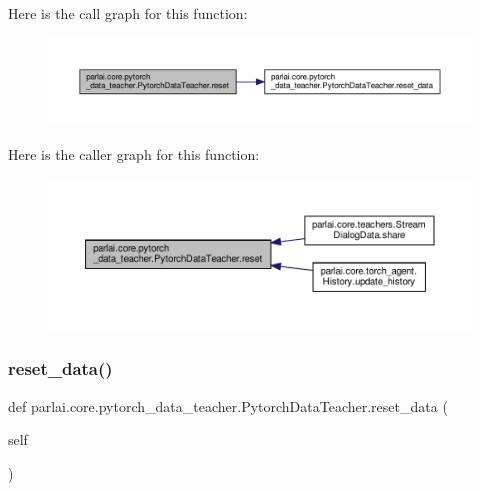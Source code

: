 Here is the call graph for this function\+:
\nopagebreak
\begin{figure}[H]
\begin{center}
\leavevmode
\includegraphics[width=350pt]{classparlai_1_1core_1_1pytorch__data__teacher_1_1PytorchDataTeacher_a568fb8e02997d9662be51a205d0ea886_cgraph}
\end{center}
\end{figure}
Here is the caller graph for this function\+:
\nopagebreak
\begin{figure}[H]
\begin{center}
\leavevmode
\includegraphics[width=350pt]{classparlai_1_1core_1_1pytorch__data__teacher_1_1PytorchDataTeacher_a568fb8e02997d9662be51a205d0ea886_icgraph}
\end{center}
\end{figure}
\mbox{\label{classparlai_1_1core_1_1pytorch__data__teacher_1_1PytorchDataTeacher_aaf9f8b1b0b358832d16f917c598151fa}} 
\subsubsection{\texorpdfstring{reset\+\_\+data()}{reset\_data()}}
{\footnotesize\ttfamily def parlai.\+core.\+pytorch\+\_\+data\+\_\+teacher.\+Pytorch\+Data\+Teacher.\+reset\+\_\+data (\begin{DoxyParamCaption}\item[{}]{self }\end{DoxyParamCaption})}

